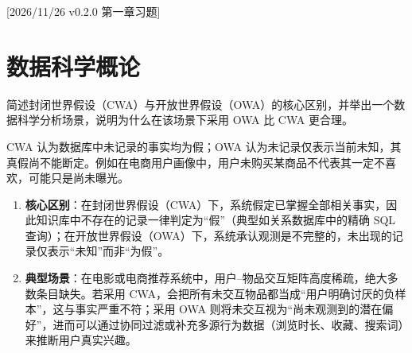 %
%
[2026/11/26 v0.2.0 第一章习题]
\section{数据科学概论}

\begin{exercise}[title={封闭世界假设与开放世界假设},level=basic,points=10,tags={CWA,OWA,数据模型}]
简述封闭世界假设（CWA）与开放世界假设（OWA）的核心区别，并举出一个数据科学分析场景，说明为什么在该场景下采用 OWA 比 CWA 更合理。
\begin{answer}
CWA 认为数据库中未记录的事实均为假；OWA 认为未记录仅表示当前未知，其真假尚不能断定。例如在电商用户画像中，用户未购买某商品不代表其一定不喜欢，可能只是尚未曝光。
\end{answer}
\begin{solution}
\begin{enumerate}
  \item \textbf{核心区别}：在封闭世界假设（CWA）下，系统假定已掌握全部相关事实，因此知识库中不存在的记录一律判定为“假”（典型如关系数据库中的精确 SQL 查询）；在开放世界假设（OWA）下，系统承认观测是不完整的，未出现的记录仅表示“未知”而非“为假”。
  \item \textbf{典型场景}：在电影或电商推荐系统中，用户–物品交互矩阵高度稀疏，绝大多数条目缺失。若采用 CWA，会把所有未交互物品都当成“用户明确讨厌的负样本”，这与事实严重不符；采用 OWA 则将未交互视为“尚未观测到的潜在偏好”，进而可以通过协同过滤或补充多源行为数据（浏览时长、收藏、搜索词）来推断用户真实兴趣。
\end{enumerate}
\end{solution}
\end{exercise}


